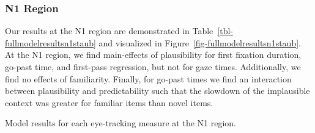 \documentclass[
  12pt,
  letterpaper,
]{scrreport}
\begin{document}
\subsubsection{N1 Region}\label{n1-region}

Our results at the N1 region are demonstrated in
Table~\ref{tbl-fullmodelresultsn1staub} and visualized in
Figure~\ref{fig-fullmodelresultsn1staub}. At the N1 region, we find
main-effects of plausibility for first fixation duration, go-past time,
and first-pass regression, but not for gaze times. Additionally, we find
no effects of familiarity. Finally, for go-past times we find an
interaction between plausibility and predictability such that the
slowdown of the implausible context was greater for familiar items than
novel items.

\begin{table}

\caption{\label{tbl-fullmodelresultsn1staub}Model results for each
eye-tracking measure at the N1 region.}

\centering{

\centering\begingroup\fontsize{12}{14}\selectfont

}
\end{table}
\end{document}
